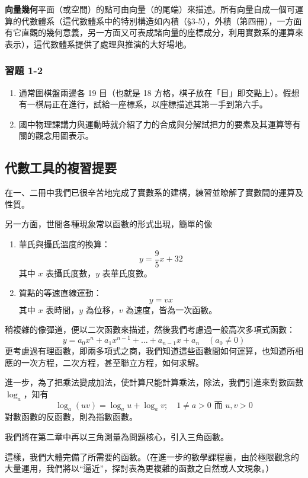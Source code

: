 \textbf{向量幾何}\quad 平面（或空間）的點可由向量（的尾端）來描述。所有向量自成一個可運算的代數體系（這代數體系中的特別構造如內積（§3-5），外積（第四冊），一方面有它直觀的幾何意義，另一方面又可表成諸向量的座標成分，利用實數系的運算來表示），這代數體系提供了處理與推演的大好場地。

\subsubsection*{習題 1-2}

\begin{enumerate}[label=\arabic*., leftmargin=2em]
  \item 通常圍棋盤兩邊各 19 目（也就是 18 方格，棋子放在「目」即交點上）。假想有一棋局正在進行，試給一座標系，以座標描述其第一手到第六手。
  \item 國中物理課講力與運動時就介紹了力的合成與分解試把力的要素及其運算等有關的觀念用圖表示。
\end{enumerate}

\subsection{代數工具的複習提要}
\label{subsec:b3s-1-3}

在一、二冊中我們已很辛苦地完成了實數系的建構，練習並瞭解了實數間的運算及性質。

另一方面，世間各種現象常以函數的形式出現，簡單的像
\begin{enumerate}[label=(\arabic*), leftmargin=2em]
  \item 華氏與攝氏溫度的換算：
  \[ y = \frac{9}{5}x + 32 \]
  其中 $x$ 表攝氏度數，$y$ 表華氏度數。
  \item 質點的等速直線運動：
  \[ y = vx \]
  其中 $x$ 表時間，$y$ 為位移，$v$ 為速度，皆為一次函數。
\end{enumerate}

稍複雜的像彈道，便以二次函數來描述，然後我們考慮過一般高次多項式函數：
\[ y = a_0 x^n + a_1 x^{n-1} + \dots + a_{n-1} x + a_n \quad (a_0 \ne 0) \]
更考慮過有理函數，即兩多項式之商，我們知道這些函數間如何運算，也知道所相應的一次方程，二次方程，甚至聯立方程，如何求解。

進一步，為了把乘法變成加法，使計算尺能計算乘法，除法，我們引進來對數函數 $\log_a$，知有
\[ \log_a (uv) = \log_a u + \log_a v;\quad 1 \ne a > 0 \text{ 而 } u, v > 0 \]
對數函數的反函數，則為指數函數。

我們將在第二章中再以三角測量為問題核心，引入三角函數。

這樣，我們大體完備了所需要的函數。（在進一步的數學課程裏，由於極限觀念的大量運用，我們將以“逼近”，探討表為更複雜的函數之自然或人文現象。）

